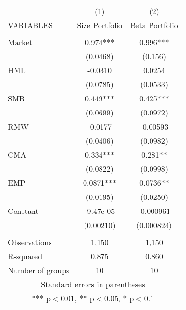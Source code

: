 \begin{tabular}{lcc} \hline
 & (1) & (2) \\
VARIABLES & Size Portfolio & Beta Portfolio \\ \hline
 &  &  \\
Market & 0.974*** & 0.996*** \\
 & (0.0468) & (0.156) \\
HML & -0.0310 & 0.0254 \\
 & (0.0785) & (0.0533) \\
SMB & 0.449*** & 0.425*** \\
 & (0.0699) & (0.0972) \\
RMW & -0.0177 & -0.00593 \\
 & (0.0406) & (0.0982) \\
CMA & 0.334*** & 0.281** \\
 & (0.0822) & (0.0998) \\
EMP & 0.0871*** & 0.0736** \\
 & (0.0195) & (0.0250) \\
Constant & -9.47e-05 & -0.000961 \\
 & (0.00210) & (0.000824) \\
 &  &  \\
Observations & 1,150 & 1,150 \\
R-squared & 0.875 & 0.860 \\
 Number of groups & 10 & 10 \\ \hline
\multicolumn{3}{c}{ Standard errors in parentheses} \\
\multicolumn{3}{c}{ *** p$<$0.01, ** p$<$0.05, * p$<$0.1} \\
\end{tabular}
